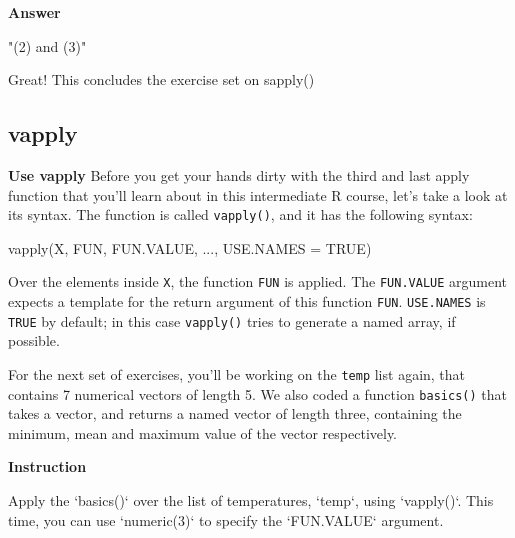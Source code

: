 \documentclass[]{article}
\newcommand{\hlstr}[1]{\textcolor[rgb]{0.251,0.627,0.251}{#1}}%
\newcommand{\hlstd}[1]{\textcolor[rgb]{0.251,0.251,0.251}{#1}}%
\newcommand{\hlkwc}[1]{\textcolor[rgb]{0.251,0.251,0.251}{#1}}%
\newcommand{\hlkwd}[1]{\textcolor[rgb]{0.878,0.439,0.125}{#1}}%
\newenvironment{Shaded}{\begin{myshaded}}{\end{myshaded}}
\renewenvironment{verbatim}{\color{codecolor}\begin{myshaded}\begin{oldverbatim}}{\end{oldverbatim}\end{myshaded}}
\newcommand{\KeywordTok}[1]{\hlkwd{#1}}
\newcommand{\DataTypeTok}[1]{\hlkwc{#1}}
\newcommand{\StringTok}[1]{\hlstr{#1}}
\newcommand{\OtherTok}[1]{{#1}}
\newcommand{\NormalTok}[1]{\hlstd{#1}}
\begin{document}
\textbf{Answer}

\begin{verbatim}
   [1] "(2) and (3)"
\end{verbatim}

Great! This concludes the exercise set on sapply()

\subsection{vapply}\label{vapply}

\textbf{Use vapply} Before you get your hands dirty with the third and
last apply function that you'll learn about in this intermediate R
course, let's take a look at its syntax. The function is called
\texttt{vapply()}, and it has the following syntax:

\begin{Shaded}
\begin{Highlighting}[]
\KeywordTok{vapply}\NormalTok{(X, FUN, FUN.VALUE, ..., }\DataTypeTok{USE.NAMES =} \OtherTok{TRUE}\NormalTok{)}
\end{Highlighting}
\end{Shaded}

Over the elements inside \texttt{X}, the function \texttt{FUN} is
applied. The \texttt{FUN.VALUE} argument expects a template for the
return argument of this function \texttt{FUN}. \texttt{USE.NAMES} is
\texttt{TRUE} by default; in this case \texttt{vapply()} tries to
generate a named array, if possible.

For the next set of exercises, you'll be working on the \texttt{temp}
list again, that contains 7 numerical vectors of length 5. We also coded
a function \texttt{basics()} that takes a vector, and returns a named
vector of length three, containing the minimum, mean and maximum value
of the vector respectively.

\textbf{Instruction}

\begin{Shaded}
\begin{Highlighting}[]
\OperatorTok{*}\StringTok{ }\NormalTok{Apply the } \StringTok{`}\DataTypeTok{basics()}\StringTok{`}\NormalTok{ over the list of temperatures, }\StringTok{`}\DataTypeTok{temp}\StringTok{`}\NormalTok{, using }\StringTok{`}\DataTypeTok{vapply()}\StringTok{`}\NormalTok{. This time,   you can use }\StringTok{`}\DataTypeTok{numeric(3)}\StringTok{`}\NormalTok{ to specify the }\StringTok{`}\DataTypeTok{FUN.VALUE}\StringTok{`}\NormalTok{ argument.}
\end{Highlighting}
\end{Shaded}
\end{document}
